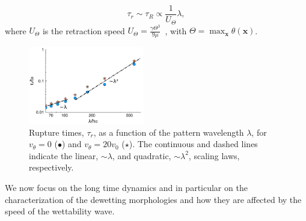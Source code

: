 \documentclass[twocolumn,amsmath,amssymb,showpacs,prl,superscriptaddress]{revtex4-1} %
\begin{document}
\begin{equation}\label{eq:taur_l1}
 \tau_r \sim \tau_R \propto \frac{1}{U_{\Theta}}\lambda,
\end{equation}
where $U_{\Theta}$ is the retraction speed $U_{\Theta} = \frac{\gamma \Theta^3}{9\mu}$~\cite{Edwards2016}, with $\Theta = \max_{\mathbf{x}}\theta(\mathbf{x})$.
\begin{figure}
    \centering
    \includegraphics[width=0.45\textwidth]{Figure_2.pdf}
    \caption{Rupture times, $\tau_r$, as a function of the pattern wavelength $\lambda$, for $v_{\theta}=0$ (\textcolor{jlblue}{$\bullet$}) and $v_{\theta}=20 v_0$ 
    (\textcolor{jlorange}{$\star$}).
    The continuous and dashed lines indicate the linear, $\sim \lambda$, and quadratic, $\sim \lambda^2$, scaling laws, respectively.
        }
    \label{fig:model_rt}
\end{figure}
We now focus on the long time dynamics and in particular on the characterization of the dewetting morphologies and how they are affected by the speed of the wettability wave.
\end{document}
